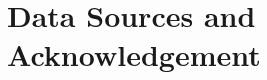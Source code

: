 \documentclass[
  letterpaper,
  DIV=11,
  numbers=noendperiod]{scrartcl}
\begin{document}
\begin{figure}

\caption{\label{fig-UrbanpopulationAQI}}


\end{figure}%

\begin{figure}

\caption{\label{fig-OzoneLandAreaRelation}}


\end{figure}%

\section{Data Sources and
Acknowledgement}\label{data-sources-and-acknowledgement}
\end{document}
